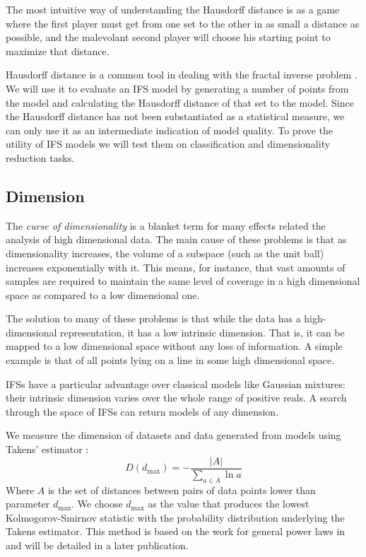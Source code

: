 \documentclass[10pt,a4paper,oneside]{article}
\theoremstyle{definition}
\begin{document}
The most intuitive way of understanding the Hausdorff distance is as a game where the first player must get from one set to the other in as small a distance as possible, and the malevolant second player will choose his starting point to maximize that distance.

Hausdorff distance is a common tool in dealing with the fractal inverse problem \cite{nettleton1994evolutionary}. We will use it to evaluate an IFS model by generating a number of points from the model and calculating the Hausdorff distance of that set to the model. Since the Hausdorff distance has not been substantiated as a statistical measure, we can only use it as an intermediate indication of model quality. To prove the utility of IFS models we will test them on classification and dimensionality reduction tasks.

\subsection*{Dimension}

The \textit{curse of dimensionality} is a blanket term for many effects related the analysis of high dimensional data. The main cause of these problems is that as dimensionality increases, the volume of a subspace (such as the unit ball) increases exponentially with it. This means, for instance, that vast amounts of samples are required to maintain the same level of coverage in a high dimensional space as compared to a low dimensional one. 

The solution to many of these problems is that while the data has a high-dimensional representation, it has a low intrinsic dimension. That is, it can be mapped to a low dimensional space without any loss of information. A simple example is that of all points lying on a line in some high dimensional space. 

IFSs have a particular advantage over classical models like Gaussian mixtures: their intrinsic dimension varies over the whole range of positive reals. A search through the space of IFSs can return models of any dimension.

We measure the dimension of datasets and data generated from models using Takens' estimator \cite{takens1985numerical}:
\[
D(d_{\mbox{max}}) = -\frac{|A|}{\sum_{a \in A} \ln a} 
\]
Where $A$ is the set of distances between pairs of data points lower than parameter $d_{\mbox{max}}$. We choose $d_{\mbox{max}}$ as the value that produces the lowest Kolmogorov-Smirnov statistic with the probability distribution underlying the Takens estimator. This method is based on the work for general power laws in \cite{clauset2009power} and will be detailed in a later publication. 
\end{document}
